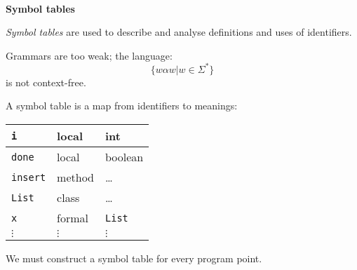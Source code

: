 



\begin{slide*}
\begin{tabbing}
~\\
{\Huge\bf Symbol tables}\\
\end{tabbing}

\vspace{0.4in}

\begin{center}
\end{center}

\vfil
\end{slide*}

\begin{slide*}
{\em Symbol tables\/} are used to describe and analyse
definitions and uses of identifiers.

Grammars are too weak; the language:
$$ \{w\alpha w | w \in \Sigma^*\} $$
is not context-free.

A symbol table is a map from identifiers to meanings:

\begin{scriptsize}
\begin{center}
\begin{tabular}{|l|l|l|}
\hline
{\tt i} & local & int \\\hline
{\tt done} & local & boolean\\\hline
{\tt insert} & method & \ldots\\\hline
{\tt List} & class & \ldots\\\hline
{\tt x} & formal & {\tt List}\\\hline
 $\vdots$ & $\vdots$ & $\vdots$\\
\end{tabular}
\end{center}
\end{scriptsize}

We must construct a symbol table for every program point.
\vfil
\end{slide*}
 
